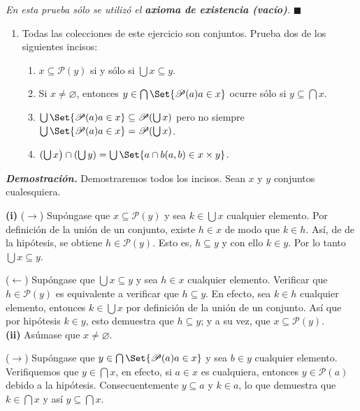 \documentclass[12pt]{article}
\providecommand\given{}
\renewcommand{\emptyset}{\varnothing}
\newcounter{A}
\newenvironment{ejercicio}{\begin{enumerate}[\bfseries \text{EJ \theA}.]\item}{\end{enumerate}\stepcounter{A}}
\begin{document}
    \hfill \textit{En esta prueba sólo se utilizó el \textbf{axioma de existencia (vacío)}.} \quad \ensuremath{\blacksquare} \\

    \begin{ejercicio}
        Todas las colecciones de este ejercicio son conjuntos. Prueba dos de los siguientes incisos:
        \begin{enumerate}
            \item \(x \subseteq \mathscr{P}(y)\) si y sólo si \(\bigcup x \subseteq y\).
            \item Si \(x \neq \emptyset\), entonces \(y \in \bigcap\Set{\mathscr{P}(a) \given a \in x}\) ocurre sólo si \(y \subseteq \bigcap x\).
            \item \( \bigcup \Set{ \mathscr{P}(a) \given a \in x } \subseteq \mathscr{P}(\bigcup x) \) pero no siempre \( \bigcup \Set{ \mathscr{P}(a) \given a \in x } = \mathscr{P}(\bigcup x) \).
            \item \( ( \bigcup x \big) \cap ( \bigcup y ) = \bigcup \Set{ a \cap b \given (a,b) \in x \times y } \).
        \end{enumerate}
    \end{ejercicio}

    \textbf{\textit{Demostración.}} Demostraremos todos los incisos. Sean \(x\) y \(y\) conjuntos cualesquiera.

    \textbf{(i)} (\(\rightarrow\)) Supóngase que \(x \subseteq \mathscr{P}(y)\)
    y sea \(k \in \bigcup x\) cualquier elemento. Por definición de la unión de
    un conjunto, existe \(h \in x\) de modo que \(k \in h\). Así, de de la
    hipótesis, se obtiene \(h \in \mathscr{P}(y)\). Esto es, \(h \subseteq y\)
    y con ello \(k \in y\). Por lo tanto \(\bigcup x \subseteq y\).

    (\(\leftarrow\)) Supóngase que \(\bigcup x \subseteq y\) y sea \(h \in x\) cualquier elemento. Verificar que \(h \in \mathscr{P}(y)\) es equivalente a verificar que \(h \subseteq y\). En efecto, sea \(k \in h\) cualquier elemento, entonces \(k \in \bigcup x\) por definición de la unión de un conjunto. Así que por hipótesis \(k \in y\), esto demuestra que \(h \subseteq y\); y a su vez, que \(x \subseteq \mathscr{P}(y)\).\\

    \textbf{(ii)} Asúmase que \(x \neq \emptyset\).
    
    (\(\rightarrow\)) Supóngase que \(y \in \bigcap\Set{\mathscr{P}(a) \given a \in x}\) y sea \(b \in y\) cualquier elemento. Verifiquemos que \(y \in \bigcap x\), en efecto, si \(a \in x\) es cualquiera, entonces \(y \in \mathscr{P}(a)\) debido a la hipótesis. Consecuentemente \(y \subseteq a\) y \(k \in a\), lo que demuestra que \(k \in \bigcap x\) y así \(y \subseteq \bigcap x\).
\end{document}
